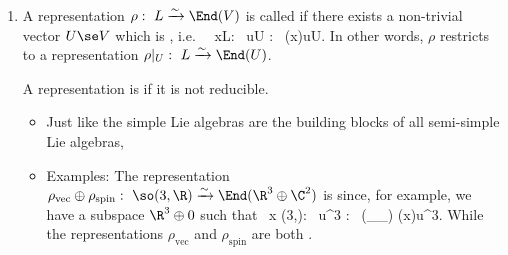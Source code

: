 \documentclass{article}
\newcommand{\cl}{:\text{ }}
\begin{document}
\begin{enumerate}
\item {}
A representation $\rho\cl L \xrightarrow{\sim} \End(V)$ is called  if there exists a non-trivial vector  $U\se V$ which is , i.e.\
\bse
\forall \, x\in L: \forall \, u\in U : \ \rho(x)u\in U.
\ese
In other words, $\rho$ restricts to a representation $\rho|_U\cl L \xrightarrow{\sim} \End(U)$. 


A representation is  if it is not reducible.
\begin{itemize}
    \item Just like the simple Lie algebras are the building blocks of all semi-simple Lie algebras, 
    \item Examples: The representation $\rho_{\mathrm{vec}}\oplus \rho_{\mathrm{spin}}\cl \so(3,\R)\xrightarrow{\sim}\End(\R^3\oplus\C^2)$ is \tb{reducible} since, for example, we have a subspace $\R^3\oplus 0$ such that
\bse
\forall \, x \in \so(3,\R): \forall \, u\in \R^3 : \ (\rho_{}\oplus \rho_{}) (x)u\in\R^3.
\ese
While the representations $\rho_{\mathrm{vec}}$ and $\rho_{\mathrm{spin}}$ are both .
\end{itemize}



\end{enumerate}
\end{document}
